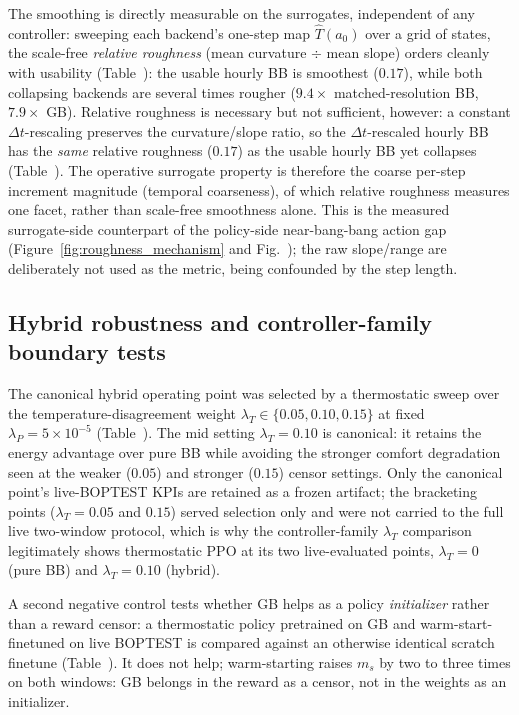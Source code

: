  The smoothing is directly measurable on the surrogates, independent of any controller: sweeping each backend's one-step map $\hat T(a_0)$ over a grid of states, the scale-free \emph{relative roughness} (mean curvature $\div$ mean slope) orders cleanly with usability (Table~): the usable hourly BB is smoothest ($0.17$), while both collapsing backends are several times rougher ($9.4\times$ matched-resolution BB, $7.9\times$ GB). Relative roughness is necessary but not sufficient, however: a constant $\Delta t$-rescaling preserves the curvature/slope ratio, so the $\Delta t$-rescaled hourly BB has the \emph{same} relative roughness ($0.17$) as the usable hourly BB yet collapses (Table~). The operative surrogate property is therefore the coarse per-step increment magnitude (temporal coarseness), of which relative roughness measures one facet, rather than scale-free smoothness alone. This is the measured surrogate-side counterpart of the policy-side near-bang-bang action gap (Figure~\ref{fig:roughness_mechanism} and Fig.~); the raw slope/range are deliberately not used as the metric, being confounded by the step length.





\subsection{Hybrid robustness and controller-family boundary tests}\label{ssec:hybrid-recovery}

The canonical hybrid operating point was selected by a thermostatic sweep over the temperature-disagreement weight $\lambda_T\in\{0.05,0.10,0.15\}$ at fixed $\lambda_P=5\times10^{-5}$ (Table~). The mid setting $\lambda_T=0.10$ is canonical: it retains the energy advantage over pure BB while avoiding the stronger comfort degradation seen at the weaker ($0.05$) and stronger ($0.15$) censor settings. Only the canonical point's live-BOPTEST KPIs are retained as a frozen artifact; the bracketing points ($\lambda_T=0.05$ and $0.15$) served selection only and were not carried to the full live two-window protocol, which is why the controller-family $\lambda_T$ comparison legitimately shows thermostatic PPO at its two live-evaluated points, $\lambda_T=0$ (pure BB) and $\lambda_T=0.10$ (hybrid).





A second negative control tests whether GB helps as a policy \emph{initializer} rather than a reward censor: a thermostatic policy pretrained on GB and warm-start-finetuned on live BOPTEST is compared against an otherwise identical scratch finetune (Table~). It does not help; warm-starting raises $m_s$ by two to three times on both windows: GB belongs in the reward as a censor, not in the weights as an initializer.





